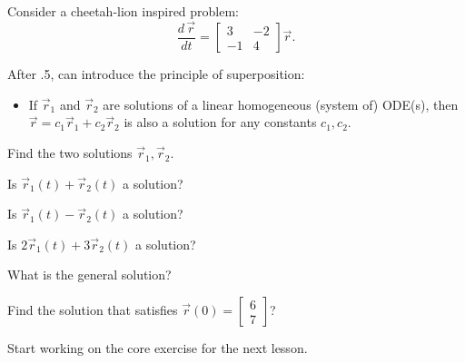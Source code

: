 \question \label{sys:2real}
Consider a cheetah-lion inspired problem:
$$
\frac{d \,\vec{r}}{dt} = \begin{bmatrix} 3 & -2 \\ -1 & 4\end{bmatrix} \vec{r}.
$$
\begin{annotation}
\begin{goals}
	After .5, can introduce the principle of superposition:
	\begin{itemize}
		\item If $\vec{r}_1$ and $\vec{r}_2$ are solutions of a linear homogeneous (system of) ODE(s), then $\vec{r} = c_1 \vec{r}_1 + c_2\vec{r}_2$ is also a solution for any constants $c_1,c_2$.
	\end{itemize}
\end{goals}	
\end{annotation}
\begin{parts}
	\item Find the two solutions $\vec{r}_1, \vec{r}_2$.
	\item Is $\vec{r}_1(t) + \vec{r}_2(t)$ a solution?
	\item Is $\vec{r}_1(t) - \vec{r}_2(t)$ a solution?
	\item Is $2\vec{r}_1(t) + 3\vec{r}_2(t)$ a solution?
	\item What is the general solution?
	\item Find the solution that satisfies $\vec{r}(0) = \begin{bmatrix} 6 \\ 7\end{bmatrix}$?
\end{parts}
\begin{annotation}
\begin{goals}
	Start working on the core exercise for the next lesson.
\end{goals}	
\end{annotation}


